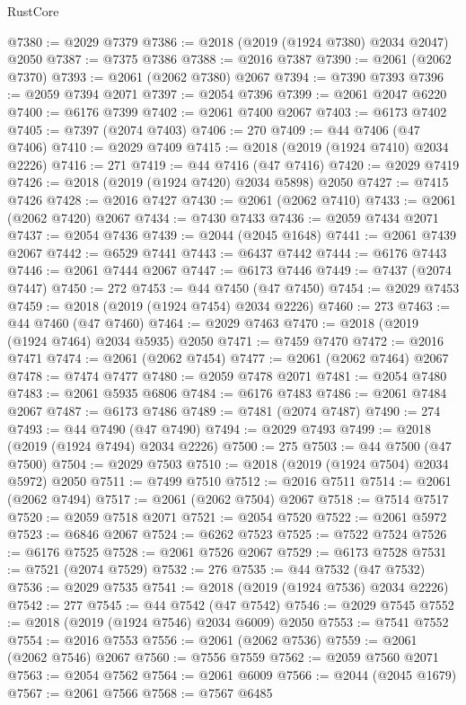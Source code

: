 \begin{lexlean}{RustCore}
\begin{coremodule}
@7380 := @2029 @7379
@7386 := @2018 (@2019 (@1924 @7380) @2034 @2047) @2050
@7387 := @7375 @7386
@7388 := @2016 @7387
@7390 := @2061 (@2062 @7370)
@7393 := @2061 (@2062 @7380) @2067
@7394 := @7390 @7393
@7396 := @2059 @7394 @2071
@7397 := @2054 @7396
@7399 := @2061 @2047 @6220
@7400 := @6176 @7399
@7402 := @2061 @7400 @2067
@7403 := @6173 @7402
@7405 := @7397 (@2074 @7403)
@7406 := 270
@7409 := @44 @7406 (@47 @7406)
@7410 := @2029 @7409
@7415 := @2018 (@2019 (@1924 @7410) @2034 @2226)
@7416 := 271
@7419 := @44 @7416 (@47 @7416)
@7420 := @2029 @7419
@7426 := @2018 (@2019 (@1924 @7420) @2034 @5898) @2050
@7427 := @7415 @7426
@7428 := @2016 @7427
@7430 := @2061 (@2062 @7410)
@7433 := @2061 (@2062 @7420) @2067
@7434 := @7430 @7433
@7436 := @2059 @7434 @2071
@7437 := @2054 @7436
@7439 := @2044 (@2045 @1648)
@7441 := @2061 @7439 @2067
@7442 := @6529 @7441
@7443 := @6437 @7442
@7444 := @6176 @7443
@7446 := @2061 @7444 @2067
@7447 := @6173 @7446
@7449 := @7437 (@2074 @7447)
@7450 := 272
@7453 := @44 @7450 (@47 @7450)
@7454 := @2029 @7453
@7459 := @2018 (@2019 (@1924 @7454) @2034 @2226)
@7460 := 273
@7463 := @44 @7460 (@47 @7460)
@7464 := @2029 @7463
@7470 := @2018 (@2019 (@1924 @7464) @2034 @5935) @2050
@7471 := @7459 @7470
@7472 := @2016 @7471
@7474 := @2061 (@2062 @7454)
@7477 := @2061 (@2062 @7464) @2067
@7478 := @7474 @7477
@7480 := @2059 @7478 @2071
@7481 := @2054 @7480
@7483 := @2061 @5935 @6806
@7484 := @6176 @7483
@7486 := @2061 @7484 @2067
@7487 := @6173 @7486
@7489 := @7481 (@2074 @7487)
@7490 := 274
@7493 := @44 @7490 (@47 @7490)
@7494 := @2029 @7493
@7499 := @2018 (@2019 (@1924 @7494) @2034 @2226)
@7500 := 275
@7503 := @44 @7500 (@47 @7500)
@7504 := @2029 @7503
@7510 := @2018 (@2019 (@1924 @7504) @2034 @5972) @2050
@7511 := @7499 @7510
@7512 := @2016 @7511
@7514 := @2061 (@2062 @7494)
@7517 := @2061 (@2062 @7504) @2067
@7518 := @7514 @7517
@7520 := @2059 @7518 @2071
@7521 := @2054 @7520
@7522 := @2061 @5972
@7523 := @6846 @2067
@7524 := @6262 @7523
@7525 := @7522 @7524
@7526 := @6176 @7525
@7528 := @2061 @7526 @2067
@7529 := @6173 @7528
@7531 := @7521 (@2074 @7529)
@7532 := 276
@7535 := @44 @7532 (@47 @7532)
@7536 := @2029 @7535
@7541 := @2018 (@2019 (@1924 @7536) @2034 @2226)
@7542 := 277
@7545 := @44 @7542 (@47 @7542)
@7546 := @2029 @7545
@7552 := @2018 (@2019 (@1924 @7546) @2034 @6009) @2050
@7553 := @7541 @7552
@7554 := @2016 @7553
@7556 := @2061 (@2062 @7536)
@7559 := @2061 (@2062 @7546) @2067
@7560 := @7556 @7559
@7562 := @2059 @7560 @2071
@7563 := @2054 @7562
@7564 := @2061 @6009
@7566 := @2044 (@2045 @1679)
@7567 := @2061 @7566
@7568 := @7567 @6485

\end{coremodule}
\end{lexlean}
